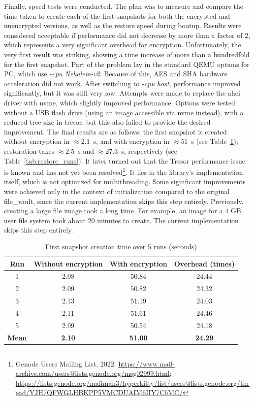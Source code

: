 Finally, speed tests were conducted. The plan was to measure and compare the time taken to create each of the first snapshots for both the encrypted and unencrypted versions, as well as the restore speed during bootup. Results were considered acceptable if performance did not decrease by more than a factor of 2, which represents a very significant overhead for encryption. Unfortunately, the very first result was striking, showing a time increase of more than a hundredfold for the first snapshot. Part of the problem lay in the standard QEMU options for PC, which use \textit{-cpu Nehalem-v2}. Because of this, AES and SHA hardware acceleration did not work. After switching to \textit{-cpu host}, performance improved significantly, but it was still very low. Attempts were made to replace the ahci driver with nvme, which slightly improved performance. Options were tested without a USB flash drive (using an image accessible via nvme instead), with a reduced tree size in tresor, but this also failed to provide the desired improvement. The final results are as follows: the first snapshot is created without encryption in $\approx$2.1~s, and with encryption in $\approx$51~s (see Table~\ref{tab:perf_runs}); restoration takes $\approx$2.5~s and $\approx$27.3~s, respectively (see Table~\ref{tab:restore_runs}). It later turned out that the Tresor performance issue is known and has not yet been resolved\footnote{ Genode Users Mailing List, 2022: \url{https://www.mail-archive.com/users@lists.genode.org/msg02999.html}; \url{https://lists.genode.org/mailman3/hyperkitty/list/users@lists.genode.org/thread/YJH7QFWGLHBKPP5VMCDUAIM6IIY7C6MC/} }. It lies in the library’s implementation itself, which is not optimized for multithreading. Some significant improvements were achieved only in the context of initialization compared to the original file\_vault, since the current implementation skips this step entirely. Previously, creating a large file image took a long time. For example, an image for a 4 GB user file system took about 20 minutes to create. The current implementation skips this step entirely.

\begin{table}[H]
\centering
\caption{First snapshot creation time over 5 runs (seconds)}
\label{tab:perf_runs}
\begin{tabular}{|c|c|c|c|}
\toprule
\textbf{Run} & \textbf{Without encryption} & \textbf{With encryption} & \textbf{Overhead (times)} \\
\midrule
1 & 2.08 & 50.84 & 24.44 \\
2 & 2.09 & 50.82 & 24.32 \\
3 & 2.13 & 51.19 & 24.03 \\
4 & 2.11 & 51.61 & 24.46 \\
5 & 2.09 & 50.54 & 24.18 \\
\midrule
\textbf{Mean} & \textbf{2.10} & \textbf{51.00} & \textbf{24.29} \\
\bottomrule
\end{tabular}
\end{table}

